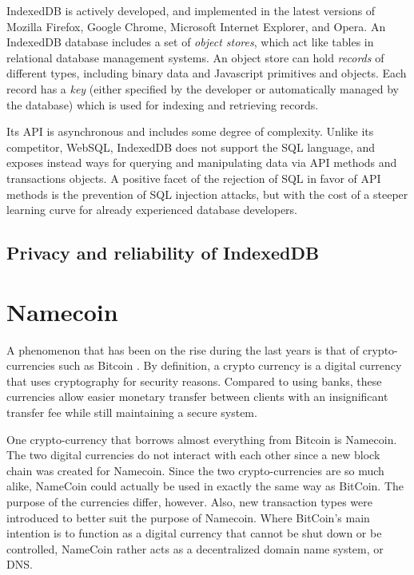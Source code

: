 IndexedDB is actively developed, and implemented in the latest versions of Mozilla Firefox, Google Chrome, Microsoft Internet Explorer, and Opera. An IndexedDB database includes a set of \emph{object stores}, which act like tables in relational database management systems. An object store can hold \emph{records} of different types, including binary data and Javascript primitives and objects. Each record has a \emph{key} (either specified by the developer or automatically managed by the database) which is used for indexing and retrieving records.

Its API is asynchronous and includes some degree of complexity. Unlike its competitor, WebSQL, IndexedDB does not support the SQL language, and exposes instead ways for querying and manipulating data via API methods and transactions objects. A positive facet of the rejection of SQL in favor of API methods is the prevention of SQL injection attacks, but with the cost of a steeper learning curve for already experienced database developers.

\subsection{Privacy and reliability of IndexedDB}

\section{Namecoin}
A phenomenon that has been on the rise during the last years is that of crypto-currencies such as Bitcoin \cite{CryptoCoinInsider:2014:Online}. By definition, a crypto currency is a digital currency that uses cryptography for security reasons. Compared to using banks, these currencies allow easier monetary transfer between clients with an insignificant transfer fee while still maintaining a secure system.

One crypto-currency that borrows almost everything from Bitcoin is Namecoin\cite{CryptoCoinInsider:2014:Online}. The two digital currencies do not interact with each other since a new block chain was created for Namecoin. Since the two crypto-currencies are so much alike, NameCoin could actually be used in exactly the same way as BitCoin. The purpose of the currencies differ, however. Also, new transaction types were introduced to better suit the purpose of Namecoin. Where BitCoin’s main intention is to function as a digital currency that cannot be shut down or be controlled, NameCoin rather acts as a decentralized domain name system, or DNS.

